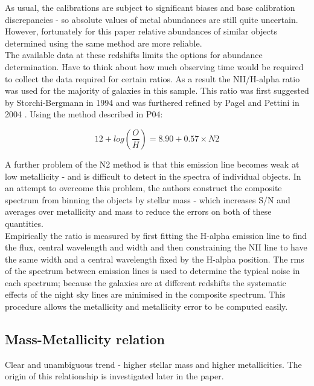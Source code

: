 \documentclass{literature}
\begin{document}
As usual, the calibrations are subject to significant biases and base calibration discrepancies - so absolute values of metal abundances are still quite uncertain. However, fortunately for this paper relative abundances of similar objects determined using the same method are more reliable. \\ 
The available data at these redshifts limits the options for abundance determination. Have to think about how much observing time would be required to collect the data required for certain ratios. As a result the NII/H-alpha ratio was used for the majority of galaxies in this sample. This ratio was first suggested by Storchi-Bergmann in 1994 \citep{Storchi-Bergmann1995} and was furthered refined by Pagel and Pettini in 2004 \citep{Pettini_2004}. Using the method described in P04: 

\begin{equation}
	12 + log(\frac{O}{H}) = 8.90 + 0.57 \times N2
\end{equation}

A further problem of the N2 method is that this emission line becomes weak at low metallicity - and is difficult to detect in the spectra of individual objects. In an attempt to overcome this problem, the authors construct the composite spectrum from binning the objects by stellar mass - which increases S/N and averages over metallicity and mass to reduce the errors on both of these quantities. \\ 

Empirically the ratio is measured by first fitting the H-alpha emission line to find the flux, central wavelength and width and then constraining the NII line to have the same width and a central wavelength fixed by the H-alpha position. The rms of the spectrum between emission lines is used to determine the typical noise in each spectrum; because the galaxies are at different redshifts the systematic effects of the night sky lines are minimised in the composite spectrum. This procedure allows the metallicity and metallicity error to be computed easily. 

\subsection{Mass-Metallicity relation}
Clear and unambiguous trend - higher stellar mass and higher metallicities. The origin of this relationship is investigated later in the paper. 
\end{document}
